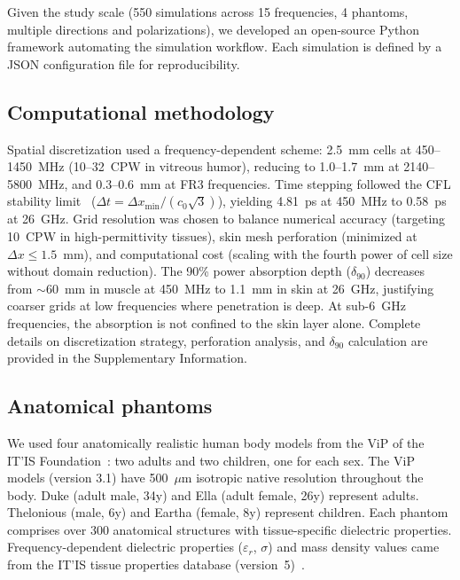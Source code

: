 \documentclass{iopjournal}
\begin{document}
Given the study scale (550 simulations across 15 frequencies, 4 phantoms, multiple directions and polarizations), we developed an open-source Python framework automating the simulation workflow.
Each simulation is defined by a JSON configuration file for reproducibility.

\subsection{Computational methodology}
Spatial discretization used a frequency-dependent scheme: 2.5~mm cells at 450--1450~MHz (10--32~\gls{CPW} in vitreous humor), reducing to 1.0--1.7~mm at 2140--5800~MHz, and 0.3--0.6~mm at FR3 frequencies.
Time stepping followed the \gls{CFL} stability limit~\citep{courant1928} ($\Delta t = \Delta x_\mathrm{min} / (c_0 \sqrt{3})$), yielding 4.81~ps at 450~MHz to 0.58~ps at 26~GHz.
Grid resolution was chosen to balance numerical accuracy (targeting 10~\gls{CPW} in high-permittivity tissues), skin mesh perforation (minimized at $\Delta x \leq 1.5$~mm), and computational cost (scaling with the fourth power of cell size without domain reduction).
The 90\% power absorption depth ($\delta_{90}$) decreases from $\sim$60~mm in muscle at 450~MHz to 1.1~mm in skin at 26~GHz, justifying coarser grids at low frequencies where penetration is deep. At sub-6~GHz frequencies, the absorption is not confined to the skin layer alone.
Complete details on discretization strategy, perforation analysis, and $\delta_{90}$ calculation are provided in the Supplementary Information.

\subsection{Anatomical phantoms}

We used four anatomically realistic human body models from the \gls{ViP} of the IT'IS Foundation~\citep{gosselin2014development}: two adults and two children, one for each sex.
The \gls{ViP} models (version 3.1) have 500~$\mu$m isotropic native resolution throughout the body.
Duke (adult male, 34y) and Ella (adult female, 26y) represent adults. Thelonious (male, 6y) and Eartha (female, 8y) represent children.
Each phantom comprises over 300 anatomical structures with tissue-specific dielectric properties.
Frequency-dependent dielectric properties ($\varepsilon_r$, $\sigma$) and mass density values came from the IT'IS tissue properties database (version~5)~\citep{itis_database}.
\end{document}
